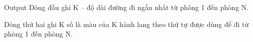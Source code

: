 Output
Dòng đầu ghi K – độ dài đường đi ngắn nhất từ phòng 1 đến phòng N.   


   Dòng thứ hai ghi K số là màu của K hành lang theo thứ tự được dùng để đi từ phòng 1 đến phòng N.